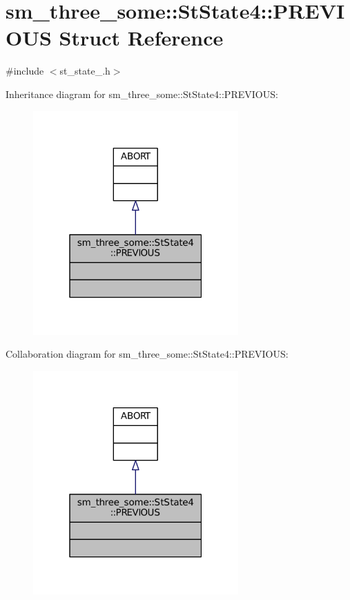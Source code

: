 \hypertarget{structsm__three__some_1_1StState4_1_1PREVIOUS}{}\section{sm\+\_\+three\+\_\+some\+:\+:St\+State4\+:\+:P\+R\+E\+V\+I\+O\+US Struct Reference}
\label{structsm__three__some_1_1StState4_1_1PREVIOUS}


{\ttfamily \#include $<$st\+\_\+state\+\_.\+h$>$}



Inheritance diagram for sm\+\_\+three\+\_\+some\+:\+:St\+State4\+:\+:P\+R\+E\+V\+I\+O\+US\+:
\nopagebreak
\begin{figure}[H]
\begin{center}
\leavevmode
\includegraphics[width=223pt]{structsm__three__some_1_1StState4_1_1PREVIOUS__inherit__graph}
\end{center}
\end{figure}


Collaboration diagram for sm\+\_\+three\+\_\+some\+:\+:St\+State4\+:\+:P\+R\+E\+V\+I\+O\+US\+:
\nopagebreak
\begin{figure}[H]
\begin{center}
\leavevmode
\includegraphics[width=223pt]{structsm__three__some_1_1StState4_1_1PREVIOUS__coll__graph}
\end{center}
\end{figure}


